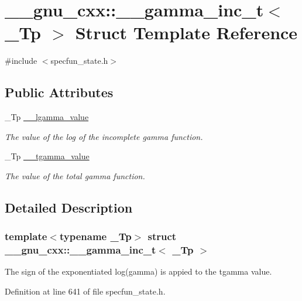 \hypertarget{struct____gnu__cxx_1_1____gamma__inc__t}{}\section{\+\_\+\+\_\+gnu\+\_\+cxx\+:\+:\+\_\+\+\_\+gamma\+\_\+inc\+\_\+t$<$ \+\_\+\+Tp $>$ Struct Template Reference}
\label{struct____gnu__cxx_1_1____gamma__inc__t}


{\ttfamily \#include $<$specfun\+\_\+state.\+h$>$}

\subsection*{Public Attributes}
\begin{DoxyCompactItemize}
\item 
\+\_\+\+Tp \hyperlink{struct____gnu__cxx_1_1____gamma__inc__t_a193b3f7871e371363571fe90b1ce1767}{\+\_\+\+\_\+lgamma\+\_\+value}
\begin{DoxyCompactList}\small\item\em The value of the log of the incomplete gamma function. \end{DoxyCompactList}\item 
\+\_\+\+Tp \hyperlink{struct____gnu__cxx_1_1____gamma__inc__t_a53d4ffc984c6685ce328caff424b5fe4}{\+\_\+\+\_\+tgamma\+\_\+value}
\begin{DoxyCompactList}\small\item\em The value of the total gamma function. \end{DoxyCompactList}\end{DoxyCompactItemize}


\subsection{Detailed Description}
\subsubsection*{template$<$typename \+\_\+\+Tp$>$\newline
struct \+\_\+\+\_\+gnu\+\_\+cxx\+::\+\_\+\+\_\+gamma\+\_\+inc\+\_\+t$<$ \+\_\+\+Tp $>$}

The sign of the exponentiated log(gamma) is appied to the tgamma value. 

Definition at line 641 of file specfun\+\_\+state.\+h.



